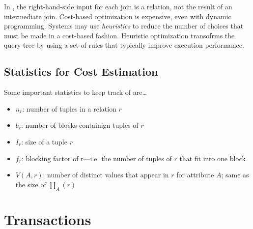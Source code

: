 \documentclass{article}
\begin{document}
In , the right-hand-side input for each join is a relation, not the result of an intermediate join. Cost-based optimization is expensive, even with dynamic programming. Systems may use \emph{heuristics} to reduce the number of choices that must be made in a cost-based fashion. Heuristic optimization transofrms the query-tree by using a set of rules that typically improve execution performance. 

\subsection{Statistics for Cost Estimation}

Some important statistics to keep track of are\dots 
\begin{itemize}
  \item $n_r$: number of tuples in a relation $r$ 
  \item $b_r$: number of blocks containign tuples of $r$
  \item $I_r$: size of a tuple $r$
  \item $f_r$: blocking factor of r---i.e. the number of tuples of $r$ that fit into one block 
  \item $V(A,r)$: number of distinct values that appear in $r$ for attribute $A$; same as the size of $\prod_A (r)$
\end{itemize}

\section{Transactions}
\end{document}
